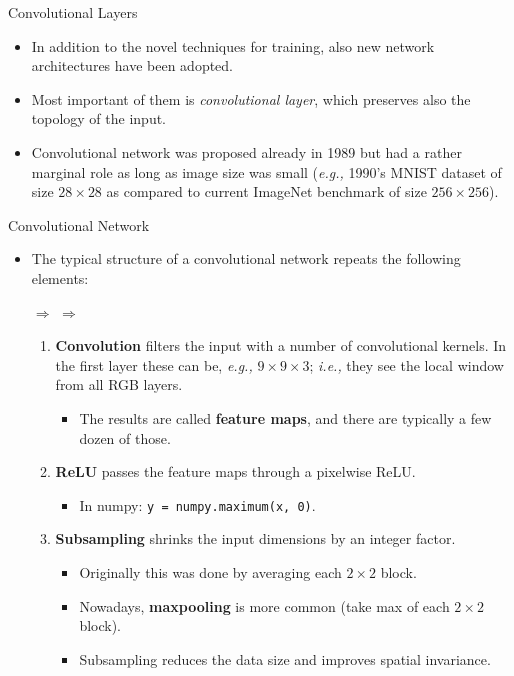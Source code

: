 \documentclass[10pt, aspectratio=169]{beamer} %
\begin{document}
\begin{frame}[fragile,allowframebreaks=0.8]{Convolutional Layers}

	\begin{itemize}
		\item In addition to the novel techniques for training, also new network architectures 
		have been adopted.
		\item Most important of them is \emph{convolutional layer}, which preserves also the topology
		of the input.
		\item Convolutional network was proposed already in 1989 but had a rather marginal role
		as long as image size was small (\emph{e.g.,} 1990's MNIST dataset of size $28\times 28$ as compared
		to current ImageNet benchmark of size $256\times 256$).
		\end{itemize}
\end{frame}

\begin{frame}[fragile]{Convolutional Network}

	\begin{itemize}
		\item 	The typical structure of a convolutional network repeats the following elements:
		
			  $\Rightarrow$  $\Rightarrow$ 
			
		\begin{enumerate}
	
	\item \textbf{Convolution} filters the input with a number of convolutional kernels. In the first layer these
	can be, \emph{e.g.,} $9\times 9\times 3$; \emph{i.e.,} they see the local window from all RGB layers.
	\begin{itemize}
		\item The results are called \textbf{feature maps}, and there are typically a few dozen of those.
	\end{itemize}
	\item \textbf{ReLU} passes the feature maps through a pixelwise ReLU. 
	\begin{itemize}
		\item In numpy: \verb+y = numpy.maximum(x, 0)+.
			\end{itemize}
	\item \textbf{Subsampling} shrinks the input dimensions by an integer factor.
	\begin{itemize}
		\item Originally this was done by averaging each $2\times 2$ block.
		\item Nowadays,
		\textbf{maxpooling} is more common (take max of each $2\times 2$ block).
		\item Subsampling reduces the data size and improves spatial invariance.
			\end{itemize}
		\end{enumerate}
	\end{itemize}

\end{frame}
\end{document}
